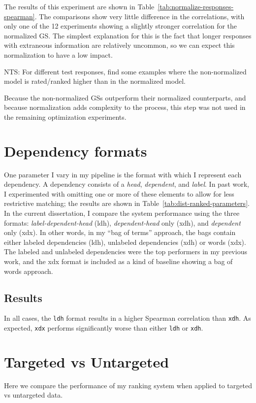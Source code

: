 The results of this experiment are shown in Table~\ref{tab:normalize-responses-spearman}. The comparisons show very little difference in the correlations, with only one of the 12 experiments showing a slightly stronger correlation for the normalized GS. The simplest explanation for this is the fact that longer responses with extraneous information are relatively uncommon, so we can expect this normalization to have a low impact. 

NTS: For different test responses, find some examples where the non-normalized model is rated/ranked higher than in the normalized model.

Because the non-normalized GSs outperform their normalized counterparts, and because normalization adds complexity to the process, this step was not used in the remaining optimization experiments.

\section{Dependency formats}
\label{section:experiment-dependency-formats}
One parameter I vary in my pipeline is the format with which I represent each dependency. A dependency consists of a \textit{head}, \textit{dependent}, and \textit{label}. In past work, I experimented with omitting one or more of these elements to allow for less restrictive matching; the results are shown in Table~\ref{tab:dist-ranked-parameters}. In the current dissertation, I compare the system performance using the three formats: \textit{label-dependent-head} (ldh), \textit{dependent-head} only (xdh), and \textit{dependent} only (xdx). In other words, in my ``bag of terms'' approach, the bags contain either labeled dependencies (ldh), unlabeled dependencies (xdh) or words (xdx). The labeled and unlabeled dependencies were the top performers in my previous work, and the xdx format is included as a kind of baseline showing a bag of words approach.

\subsection{Results}
\label{subsection:dependency-formats-results}
In all cases, the \texttt{ldh} format results in a higher Spearman correlation than \texttt{xdh}. As expected, \texttt{xdx} performs significantly worse than either \texttt{ldh} or \texttt{xdh}.

\section{Targeted vs Untargeted}
\label{section:experiment-targeted}
Here we compare the performance of my ranking system when applied to targeted vs untargeted data.
